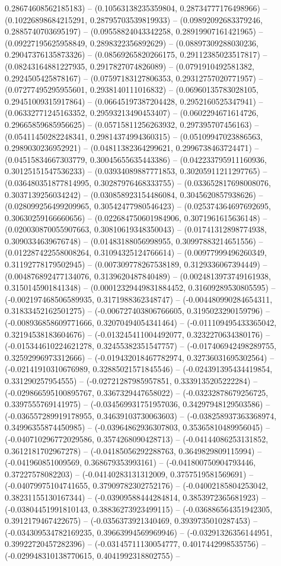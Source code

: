 0.28674608562185183) -- (0.10563138235359804, 0.28734777176498966) -- (0.10226898684215291, 0.28795703539819933) -- (0.09892092683379246, 0.2885740703695197) -- (0.09558824043342258, 0.28919907161421965) -- (0.09227195625958849, 0.2898322356892629) -- (0.08897309288030236, 0.29047376135873326) -- (0.08569265820266175, 0.29112385023517817) -- (0.08243164881227935, 0.2917827074826089) -- (0.0791910492581382, 0.2924505425878167) -- (0.07597183127806353, 0.29312757020771957) -- (0.07277495295955601, 0.2938140111016832) -- (0.06960135783028105, 0.29451009315917864) -- (0.06645197387204428, 0.2952160525347941) -- (0.06332771245163352, 0.29593213490453407) -- (0.0602294671614726, 0.29665859685956625) -- (0.05715811256263932, 0.297395707456163) -- (0.05411450282248341, 0.29814374994360315) -- (0.05109947023886563, 0.2989030236952921) -- (0.04811382364299621, 0.2996738463724471) -- (0.04515834667303779, 0.30045655635443386) -- (0.042233795911160936, 0.30125151547536233) -- (0.03934089887771853, 0.30205911211297765) -- (0.036480351877814995, 0.30287976468333755) -- (0.033652817698008076, 0.3037139256034242) -- (0.030858923154486084, 0.3045620857938626) -- (0.028099256499209965, 0.30542477980546423) -- (0.025374364697692695, 0.30630259166660656) -- (0.022684750601984906, 0.3071961615636148) -- (0.020030870055907663, 0.30810619348350043) -- (0.01741312898774938, 0.3090334639676748) -- (0.01483188056998955, 0.30997883214651556) -- (0.012287422558008264, 0.31094325124766614) -- (0.00977999496260349, 0.31192778179502945) -- (0.007309778267538189, 0.3129336067394449) -- (0.004876892477134076, 0.3139620487840489) -- (0.0024813973749161938, 0.3150145901841348) -- (0.00012329449831884452, 0.31609289530805595) -- (-0.002197468506589935, 0.3171988362348747) -- (-0.004480990284654311, 0.31833452162501275) -- (-0.006727403806766605, 0.3195023290159796) -- (-0.008936858609771666, 0.32070494054341464) -- (-0.011109495433365042, 0.32194538183604676) -- (-0.013245411004492077, 0.3232270634380176) -- (-0.015344610224621278, 0.32455382351547757) -- (-0.017406942498289755, 0.32592996973312666) -- (-0.019432018467782974, 0.32736031695302564) -- (-0.02141910310676989, 0.32885021571845546) -- (-0.024391395434419854, 0.331290257954555) -- (-0.02721287985957851, 0.3339135205222284) -- (-0.029866595100895767, 0.3367329447658022) -- (-0.03232878679256725, 0.3397555769141975) -- (-0.034569931751957036, 0.34297948129503586) -- (-0.036557289919178955, 0.34639103730063603) -- (-0.038258937363368974, 0.34996355874450985) -- (-0.03964862936307803, 0.35365810489956045) -- (-0.040710296772029586, 0.3574268090428713) -- (-0.04144086253131852, 0.3612181702967278) -- (-0.04185056292288763, 0.3649829809115994) -- (-0.041960851009569, 0.368679353993161) -- (-0.041800750904793446, 0.37227578082203) -- (-0.04140283131312009, 0.3757519581569691) -- (-0.04079975104741655, 0.37909782302752176) -- (-0.04002185804253042, 0.38231155130167344) -- (-0.03909588444284814, 0.3853972365681923) -- (-0.03804451991810143, 0.38836273923499115) -- (-0.036886564351942305, 0.3912179467422675) -- (-0.0356373921340469, 0.3939735010287453) -- (-0.034309534782169235, 0.39663994569969946) -- (-0.03291326356144951, 0.39922720457282396) -- (-0.03145711130054777, 0.4017442998535756) -- (-0.029948310138770615, 0.4041992318802755) -- 